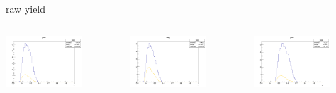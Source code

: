 \begin{frame}{raw yield}
\begin{columns}
\begin{column}[T]{0.25\textwidth}
\includegraphics[width = 0.7\textwidth]{results/yield/statistics/yield_x_Q2_z_0.55_5.500_0.45_pos.png}
\end{column}
\begin{column}[T]{0.25\textwidth}
\includegraphics[width = 0.7\textwidth]{results/yield/statistics/yield_x_Q2_z_0.55_5.500_0.45_neg.png}
\end{column}
\begin{column}[T]{0.25\textwidth}
\includegraphics[width = 0.7\textwidth]{results/yield/statistics/yield_x_Q2_z_0.55_5.500_0.55_pos.png}

\end{column}
\end{columns}
\end{frame}
